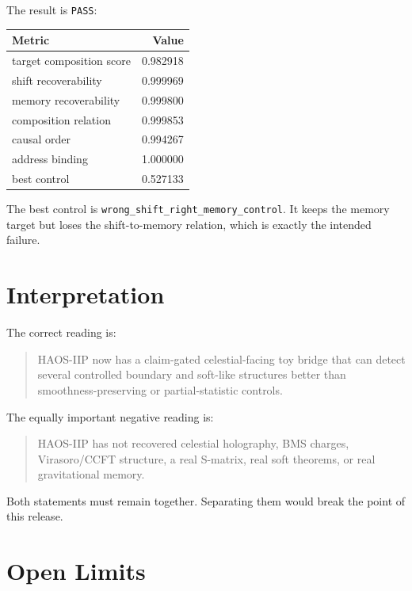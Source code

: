 \documentclass[11pt]{article}
\begin{document}
The result is \texttt{PASS}:
\begin{center}
\begin{tabular}{lr}
\toprule
Metric & Value \\
\midrule
target composition score & 0.982918 \\
shift recoverability & 0.999969 \\
memory recoverability & 0.999800 \\
composition relation & 0.999853 \\
causal order & 0.994267 \\
address binding & 1.000000 \\
best control & 0.527133 \\
\bottomrule
\end{tabular}
\end{center}

The best control is \texttt{wrong\_shift\_right\_memory\_control}. It keeps the memory target but loses the shift-to-memory relation, which is exactly the intended failure.

\section{Interpretation}

The correct reading is:
\begin{quote}
HAOS-IIP now has a claim-gated celestial-facing toy bridge that can detect several controlled boundary and soft-like structures better than smoothness-preserving or partial-statistic controls.
\end{quote}

The equally important negative reading is:
\begin{quote}
HAOS-IIP has not recovered celestial holography, BMS charges, Virasoro/CCFT structure, a real S-matrix, real soft theorems, or real gravitational memory.
\end{quote}

Both statements must remain together. Separating them would break the point of this release.

\section{Open Limits}
\end{document}
